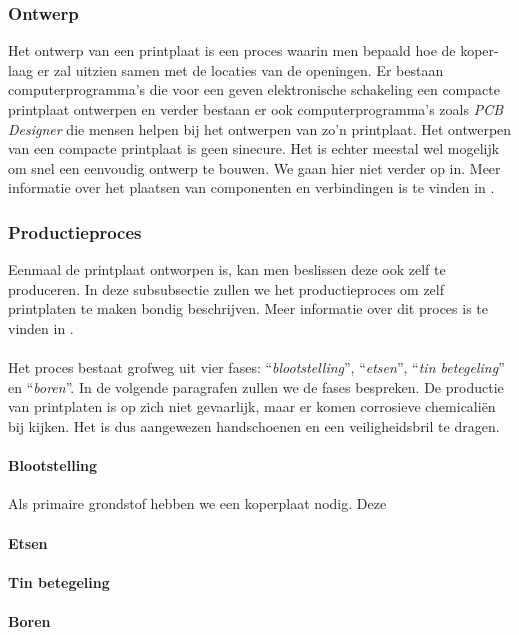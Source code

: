 \subsubsection{Ontwerp}
Het ontwerp van een printplaat is een proces waarin men bepaald hoe de koper-laag er zal uitzien samen met de locaties van de openingen. Er bestaan computerprogramma's die voor een geven elektronische schakeling een compacte printplaat ontwerpen en verder bestaan er ook computerprogramma's zoals \emph{PCB Designer} die mensen helpen bij het ontwerpen van zo'n printplaat. Het ontwerpen van een compacte printplaat is geen sinecure. Het is echter meestal wel mogelijk om snel een eenvoudig ontwerp te bouwen. We gaan hier niet verder op in. Meer informatie over het plaatsen van componenten en verbindingen is te vinden in \cite{fabricatingprintedcircuitboards}.
\subsubsection{Productieproces}
Eenmaal de printplaat ontworpen is, kan men beslissen deze ook zelf te produceren. In deze subsubsectie zullen we het productieproces om zelf printplaten te maken bondig beschrijven. Meer informatie over dit proces is te vinden in \cite{fabricatingprintedcircuitboards}.
\paragraph{}
Het proces bestaat grofweg uit vier fases: ``\emph{blootstelling}'', ``\emph{etsen}'', ``\emph{tin betegeling}'' en ``\emph{boren}''\cite[p. 69]{fabricatingprintedcircuitboards}. In de volgende paragrafen zullen we de fases bespreken. De productie van printplaten is op zich niet gevaarlijk, maar er komen corrosieve chemicali\"en bij kijken. Het is dus aangewezen handschoenen en een veiligheidsbril te dragen.
\paragraph{Blootstelling}
Als primaire grondstof hebben we een koperplaat nodig. Deze 
\paragraph{Etsen}
\paragraph{Tin betegeling}
\paragraph{Boren}
